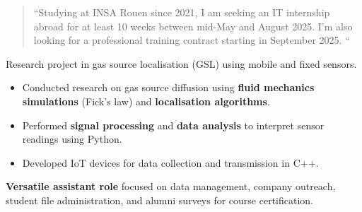 \documentclass[10pt,a4paper,ragged2e,withhyper]{./AltaCV/altacv}
\begin{document}



\makecvheader



\begin{paracol}{2}

  \begin{quote}
    ``Studying at INSA Rouen since 2021, I am seeking an IT internship abroad for at least 10 weeks between mid-May and August 2025.
    I'm also looking for a professional training contract starting in September 2025.
    ``
  \end{quote}



  Research project in gas source localisation (GSL) using mobile and fixed sensors.
  
  \begin{itemize}
    \item Conducted research on gas source diffusion using \textbf{fluid mechanics simulations} (Fick's law) and \textbf{localisation algorithms}.
    \item Performed \textbf{signal processing} and \textbf{data analysis} to interpret sensor readings using Python.
    \item Developed IoT devices for data collection and transmission in C++.
  \end{itemize}

  \divider


  \textbf{Versatile assistant role} focused on data management, company outreach, student file administration, and alumni surveys for course certification.

  \divider



\end{paracol}
\end{document}
